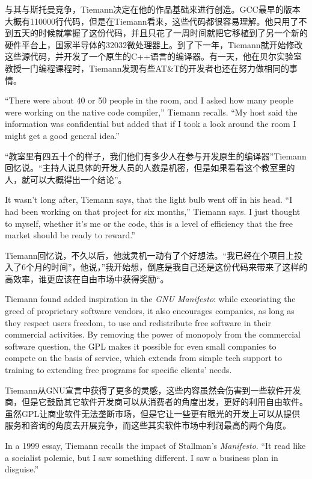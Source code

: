 \ifdefined\chs
与其与斯托曼竞争，Tiemann决定在他的作品基础来进行创造。GCC最早的版本大概有110000行代码，但是在Tiemann看来，这些代码都很容易理解。他只用了不到五天的时候就掌握了这份代码，并且只花了一周时间就把它移植到了另一个新的硬件平台上，国家半导体的32032微处理器上。到了下一年，Tiemann就开始修改这些源代码，并开发了一个原生的C++语言的编译器。有一天，他在贝尔实验室教授一门编程课程时，Tiemann发现有些AT\&T的开发者也还在努力做相同的事情。
\fi

\ifdefined\eng
``There were about 40 or 50 people in the room, and I asked how many people were working on the native code compiler,'' Tiemann recalls. ``My host said the information was confidential but added that if I took a look around the room I might get a good general idea.''
\fi

\ifdefined\chs
“教室里有四五十个的样子，我们他们有多少人在参与开发原生的编译器”Tiemann回忆说。“主持人说具体的开发人员的人数是机密，但是如果看看这个教室里的人，就可以大概得出一个结论”。
\fi

\ifdefined\eng
It wasn't long after, Tiemann says, that the light bulb went off in his head. ``I had been working on that project for six months,'' Tiemann says. I just thought to myself, whether it's me or the code, this is a level of efficiency that the free market should be ready to reward.''
\fi

\ifdefined\chs
Tiemann回忆说，不久以后，他就灵机一动有了个好想法。“我已经在个项目上投入了6个月的时间”，他说，”我开始想，倒底是我自己还是这份代码来带来了这样的高效率，谁更应该在自由市场中获得奖励“。
\fi

\ifdefined\eng
Tiemann found added inspiration in the \textit{GNU Manifesto}: while excoriating the greed of proprietary software vendors, it also encourages companies, as long as they respect users freedom, to use and redistribute free software in their commercial activities. By removing the power of monopoly from the commercial software question, the GPL makes it possible for even small companies to compete on the basis of service, which extends from simple tech support to training to extending free programs for specific clients' needs.
\fi

\ifdefined\chs
Tiemann从GNU宣言中获得了更多的灵感，这些内容虽然会伤害到一些软件开发商，但是它鼓励其它软件开发商可以从消费者的角度出发，更好的利用自由软件。虽然GPL让商业软件无法垄断市场，但是它让一些更有眼光的开发上可以从提供服务和咨询的角度去开展竞争，而这些其实软件市场中利润最高的两个角度。
\fi

\ifdefined\eng
In a 1999 essay, Tiemann recalls the impact of Stallman's \textit{Manifesto}. ``It read like a socialist polemic, but I saw something different. I saw a business plan in disguise.''
\fi

